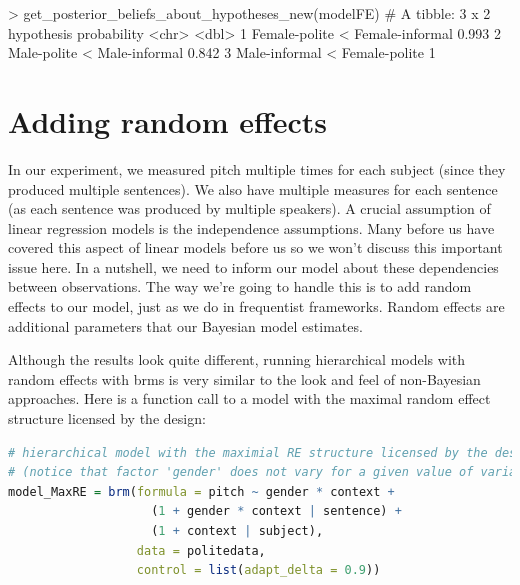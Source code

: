 \documentclass[nobib]{tufte-handout}
\begin{document}
\medskip

\begin{minipage}[]{\textwidth}
\begin{rc}
> get_posterior_beliefs_about_hypotheses_new(modelFE)
# A tibble: 3 x 2
  hypothesis                      probability
  <chr>                                 <dbl>
1 Female-polite < Female-informal       0.993
2 Male-polite < Male-informal           0.842
3 Male-informal < Female-polite         1  
\end{rc}
\end{minipage}

\section{Adding random effects}

In our experiment, we measured pitch multiple times for each subject (since they produced multiple sentences). We also have multiple measures for each sentence (as each sentence was produced by multiple speakers). A crucial assumption of linear regression models is the independence assumptions. Many before us have covered this aspect of linear models before us \citep[e.g.][]{Winter2013:Linear-models-a, clark1973language} so we won't discuss this important issue here. In a nutshell, we need to inform our model about these dependencies between observations. The way we’re going to handle this is to add random effects to our model, just as we  do in frequentist frameworks. Random effects are additional parameters that our Bayesian model estimates.

Although the results look quite different, running hierarchical models with random effects with \textrm{brms} is very similar to the look and feel of non-Bayesian approaches. Here is a function call to a model with the maximal random effect structure licensed by the design:

\begin{minipage}[]{1\textwidth}
\begin{lstlisting}[language=R]
# hierarchical model with the maximial RE structure licensed by the design
# (notice that factor 'gender' does not vary for a given value of variable 'subject')
model_MaxRE = brm(formula = pitch ~ gender * context +
                    (1 + gender * context | sentence) +
                    (1 + context | subject),
                  data = politedata,
                  control = list(adapt_delta = 0.9))
\end{lstlisting}
\end{minipage}
\end{document}
